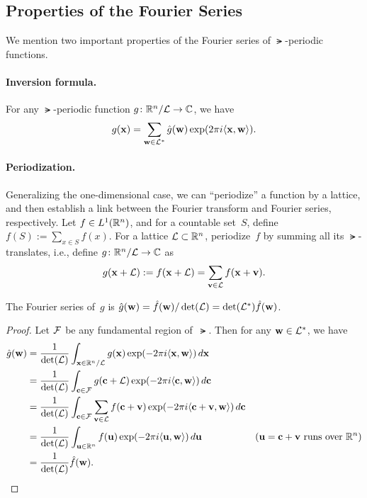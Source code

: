 \documentclass[11pt]{article}
\begin{document}
\subsection{Properties of the Fourier Series}

We mention two important properties of the Fourier series of
$\lat$-periodic functions.

\paragraph{Inversion formula.}

For any $\lat$-periodic function $g \colon \R^{n}/\lat \to \C$, we
have
\[ g(\vecx) = \sum_{\vecw \in \lat^*} \hat{g}(\vecw) \exp(2 \pi i
  \inner{\vecx,\vecw}). \]

\paragraph{Periodization.}

Generalizing the one-dimensional case, we can ``periodize'' a function
by a lattice, and then establish a link between the Fourier transform
and Fourier series, respectively. Let $f \in L^{1}(\R^{n})$, and for a
countable set~$S$, define $f(S) := \sum_{x \in S} f(x)$. For a lattice
$\lat \subset \R^{n}$, periodize~$f$ by summing all its
$\lat$-translates, i.e., define $g \colon \R^{n}/\lat \to \C$ as
\begin{equation}
  \label{eq:periodize}
  g(\vecx + \lat) := f(\vecx + \lat) = \sum_{\vecv \in \lat} f(\vecx +
  \vecv) .
\end{equation}

\begin{lemma}
  \label{lem:periodize-series}
  The Fourier series of~$g$ is
  $\hat{g}(\vecw) = \hat{f}(\vecw) / \det(\lat) = \det(\lat^{*})
  \hat{f}(\vecw)$.
\end{lemma}

\begin{proof}
  Let $\cal{F}$ be any fundamental region of~$\lat$. Then for any
  $\vecw \in \lat^{*}$, we have
  \begin{align*}
    \hat{g}(\vecw)
    &= \frac{1}{\det(\lat)} \int_{\vecx \in \R^n/\lat} g(\vecx) \exp(-
      2 \pi i  \inner{\vecx,\vecw}) \, d\vecx  \\
    &= \frac{1}{\det(\lat)} \int_{\vecc \in \cal{F}} g(\vecc + \lat) \exp(-
      2 \pi i  \inner{\vecc,\vecw}) \, d\vecc  \\
    &= \frac{1}{\det(\lat)} \int_{\vecc \in \cal{F}} \sum_{\vecv \in
      \lat} f(\vecc + \vecv) \exp(- 2 \pi i \inner{\vecc +
      \vecv,\vecw}) \, d\vecc \\
    &= \frac{1}{\det(\lat)} \int_{\vecu \in \R^{n}} f(\vecu) \exp(-2
      \pi i \inner{\vecu,\vecw}) \, d\vecu
    & \text{($\vecu=\vecc+\vecv$ runs over $\R^{n}$)} \\
    &= \frac{1}{\det(\lat)} \hat{f}(\vecw).
  \end{align*}

\end{proof}
\end{document}
